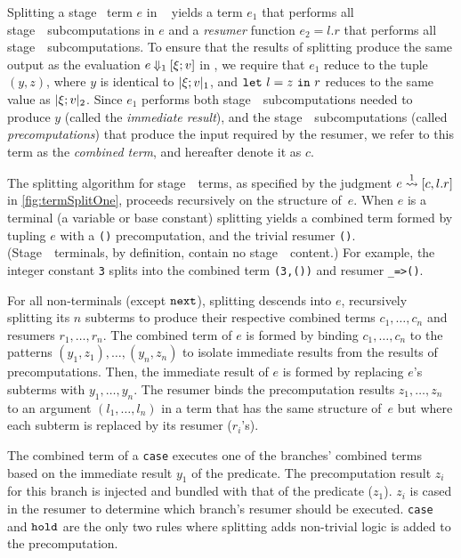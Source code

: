 Splitting a stage \bbone\ term $e$ in \lang\
yields a term 
$e_1$ that performs all stage~\bbone\ subcomputations in $e$ and a \emph{resumer} function $e_2 = l.r$ that performs all stage~\bbtwo\ subcomputations.
To ensure that the results of splitting produce the same output as the evaluation $e\mathbin{{\Downarrow_{ 1}}}[\xi;v]$ in \lang,
we require that $e_1$ reduce to the tuple $(y,z)$,
where $y$ is identical to $|\xi;v|_{ 1}$, and 
${\tt let}~{l} = {z}~{\tt in}~{r}$ reduces to the same value as $|\xi;v|_{ 2}$. Since $e_1$ performs both stage~\bbone\ subcomputations needed to produce $y$ (called the \emph{immediate result}), and the stage~\bbone\ subcomputations (called \emph{precomputations}) that produce the input required by the resumer, we refer to this term as the \emph{combined term}, and hereafter denote it as $c$.

The splitting algorithm for stage~\bbone\ terms, as specified by the
judgment $e \overset{ 1}\rightsquigarrow [c,l.r]$ in \cref{fig:termSplitOne}, proceeds
recursively on the structure of~$e$.
When $e$ is a terminal (a variable or base constant)
splitting yields a combined term formed by tupling $e$ with a \texttt{()} precomputation, and the trivial resumer \texttt{()}. (Stage~\bbone\ terminals, by definition, contain no stage~\bbtwo\ content.)  For example, the integer constant \texttt{3} splits into the combined term \texttt{(3,())} and resumer \texttt{\_=>()}.


For all non-terminals (except ${\tt next}$),
splitting descends into $e$, recursively splitting its $n$ subterms
to produce their respective combined terms $c_1,\ldots,c_n$ and resumers $r_1, \ldots, r_n$.
The combined term of $e$ is formed by binding $c_1,\ldots,c_n$
to the patterns $(y_1,z_1),\ldots,(y_n,z_n)$
to isolate immediate results from the results of precomputations. Then,
the immediate result of $e$ is formed by replacing $e$'s subterms with $y_1,\ldots,y_n$.
The resumer binds the precomputation results $z_1,\ldots,z_n$ to an
argument $(l_1,\ldots,l_n)$ in a term that has the same structure
of~$e$ but where each subterm is replaced by its resumer ($r_i$'s).

The combined term of a {\tt case} executes one of the branches' combined terms based on the immediate result $y_1$ of the predicate.
The precomputation result $z_i$ for this branch is injected and bundled with that of the predicate ($z_1$).   
$z_i$ is cased in the resumer to determine which branch's resumer should be executed.
{\tt case} and ${\tt hold}$ are the only two rules where splitting adds non-trivial logic is added to the precomputation.

